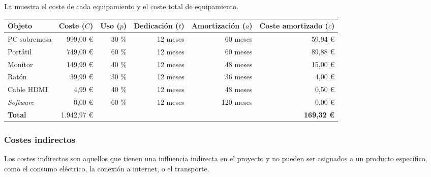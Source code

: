 \noindent
La  muestra el coste de cada equipamiento y el coste total
de equipamiento.


\begin{table}[htb]
    {
      \begin{adjustbox}{max width=\textwidth}
        \begin{tabular}{lrrrrr}
          \toprule
          \textbf{Objeto}   & \textbf{Coste ($C$)} & \textbf{Uso ($p$)} & \textbf{Dedicación ($t$)} & \textbf{Amortización ($a$)} & \textbf{Coste amortizado ($c$)} \\
          \midrule
          PC sobremesa      &  999,00 \euro        & 30 \%              & 12 meses                  &  60 meses                   &  59,94 \euro \\
          Portátil          &  749,00 \euro        & 60 \%              & 12 meses                  &  60 meses                   &  89,88 \euro \\
          Monitor           &  149,99 \euro        & 40 \%              & 12 meses                  &  48 meses                   &  15,00 \euro \\
          Ratón             &   39,99 \euro        & 30 \%              & 12 meses                  &  36 meses                   &   4,00 \euro \\
          Cable HDMI        &    4,99 \euro        & 40 \%              & 12 meses                  &  48 meses                   &   0,50 \euro \\
          \textit{Software} &    0,00 \euro        & 60 \%              & 12 meses                  & 120 meses                   &   0,00 \euro \\
          \midrule
          \textbf{Total}    & 1.942,97 \euro       &                    &                           &                             & \textbf{169,32 \euro} \\
          \bottomrule
        \end{tabular}
      \end{adjustbox}
    }
\end{table}

\subsubsection{Costes indirectos}

Los costes indirectos son aquellos que tienen una influencia indirecta en el
proyecto y no pueden ser asignados a un producto específico, como el consumo
eléctrico, la conexión a internet, o el transporte.

